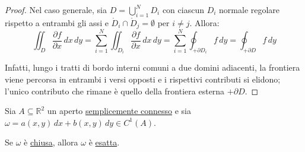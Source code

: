 \begin{proof}
Nel caso generale, sia $D = \displaystyle\bigcup_{i=1}^N D_i$ con ciascun $D_i$ normale regolare rispetto a entrambi gli assi e $\mathring{D}_i \cap \mathring{D}_j = \emptyset$ per $i \neq j$. Allora:
\[
\iint_D \frac{\partial f}{\partial x}\, dx\, dy
= \sum_{i=1}^N \iint_{D_i} \frac{\partial f}{\partial x}\, dx\, dy
= \sum_{i=1}^N \oint_{+\partial D_i} f\, dy
= \oint_{+\partial D} f\, dy
\]
\begin{center}
\end{center}
Infatti, lungo i tratti di bordo interni comuni a due domini adiacenti, la frontiera viene percorsa in entrambi i versi opposti e i rispettivi contributi si elidono; l'unico contributo che rimane è quello della frontiera esterna $+\partial D$.
\end{proof}

\begin{theorem}
Sia $A \subseteq \mathbb{R}^2$ un aperto \underline{semplicemente connesso} e sia $\omega = a(x, y)\, dx + b(x, y)\, dy \in C^1(A)$.

Se $\omega$ è \underline{chiusa}, allora $\omega$ è \underline{esatta}.
\end{theorem}

